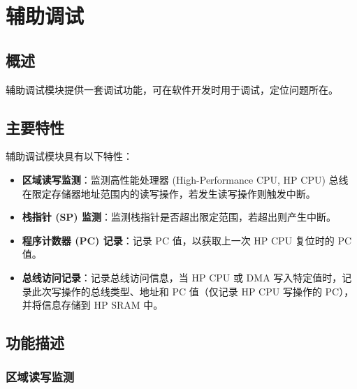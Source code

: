 \documentclass[main\_\_CN.tex]{subfiles}
\begin{document}

\ifglobal
\else
    \listoftodos
    {\let\clearpage\relax \listofdonetodos}
    \tableofcontents
\fi



\chapter{辅助调试}
\label{mod:dbgassist}
\hypertarget{dbgassist}{}

\section{概述}

\chipname{} 辅助调试模块提供一套调试功能，可在软件开发时用于调试，定位问题所在。

\section{主要特性}
\label{sec:dbgassist-features}

辅助调试模块具有以下特性：

\begin{itemize}
    \item \textbf{区域读写监测}：监测高性能处理器 (High-Performance CPU, HP CPU) 总线在限定存储器地址范围内的读写操作，若发生读写操作则触发中断。
    \item \textbf{栈指针 (SP) 监测}：监测栈指针是否超出限定范围，若超出则产生中断。
    \item \textbf{程序计数器 (PC) 记录}：记录 PC 值，以获取上一次 HP CPU 复位时的 PC 值。
    \item \textbf{总线访问记录}：记录总线访问信息，当 HP CPU 或 DMA 写入特定值时，记录此次写操作的总线类型、地址和 PC 值（仅记录 HP CPU 写操作的 PC），并将信息存储到 HP SRAM 中。
\end{itemize}

\section{功能描述}
\label{sec:dbgassist-func-descr}

\subsection{区域读写监测}
\end{document}
